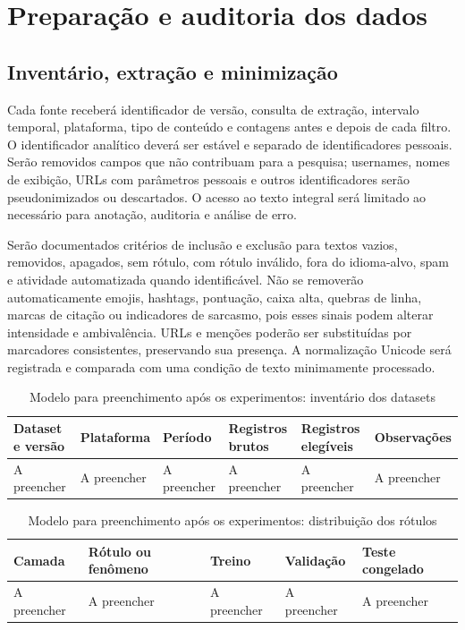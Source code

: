 \section{Preparação e auditoria dos dados}
\label{sec:preparacao-auditoria}

\subsection{Inventário, extração e minimização}

Cada fonte receberá identificador de versão, consulta de extração, intervalo temporal, plataforma, tipo de conteúdo e contagens antes e depois de cada filtro. O identificador analítico deverá ser estável e separado de identificadores pessoais. Serão removidos campos que não contribuam para a pesquisa; usernames, nomes de exibição, URLs com parâmetros pessoais e outros identificadores serão pseudonimizados ou descartados. O acesso ao texto integral será limitado ao necessário para anotação, auditoria e análise de erro.

Serão documentados critérios de inclusão e exclusão para textos vazios, removidos, apagados, sem rótulo, com rótulo inválido, fora do idioma-alvo, spam e atividade automatizada quando identificável. Não se removerão automaticamente emojis, hashtags, pontuação, caixa alta, quebras de linha, marcas de citação ou indicadores de sarcasmo, pois esses sinais podem alterar intensidade e ambivalência. URLs e menções poderão ser substituídas por marcadores consistentes, preservando sua presença. A normalização Unicode será registrada e comparada com uma condição de texto minimamente processado.

\begin{table}[htbp]
\centering
\caption{Modelo para preenchimento após os experimentos: inventário dos datasets}
\label{tab:modelo-inventario}
\begin{tabular}{|p{}|p{}|p{}|p{}|p{}|p{}|}
\hline
\textbf{Dataset e versão} & \textbf{Plataforma} & \textbf{Período} & \textbf{Registros brutos} & \textbf{Registros elegíveis} & \textbf{Observações} \\
\hline
A preencher & A preencher & A preencher & A preencher & A preencher & A preencher \\
\hline
\end{tabular}
\end{table}

\begin{table}[htbp]
\centering
\caption{Modelo para preenchimento após os experimentos: distribuição dos rótulos}
\label{tab:modelo-distribuicao}
\begin{tabular}{|p{}|p{}|p{}|p{}|p{}|}
\hline
\textbf{Camada} & \textbf{Rótulo ou fenômeno} & \textbf{Treino} & \textbf{Validação} & \textbf{Teste congelado} \\
\hline
A preencher & A preencher & A preencher & A preencher & A preencher \\
\hline
\end{tabular}
\end{table}

